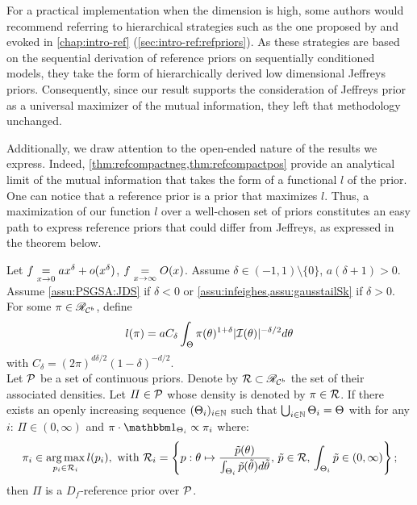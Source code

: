 For a practical implementation when the dimension is high, 
some authors would recommend referring
to hierarchical strategies such as the one proposed by \citet{berger_overall_2015} and evoked in \cref{chap:intro-ref} (\cref{sec:intro-ref:refpriors}). 
As these strategies are based on the sequential derivation of reference priors on sequentially conditioned models, they take the form of hierarchically derived low dimensional Jeffreys priors. Consequently, 
since our result supports the consideration of Jeffreys prior as a universal maximizer of the mutual information, they left that methodology unchanged.

Additionally, we draw attention to the open-ended nature of the results we express. 
Indeed, \cref{thm:refcompactneg,thm:refcompactpos} provide an analytical limit of the mutual information that takes the form of a functional $l$ of the prior.
One can notice that a reference prior is a prior that maximizes $l$.
Thus, a maximization of our function $l$ over a well-chosen set of priors constitutes an easy path to express reference priors that could differ from Jeffreys, as expressed in the theorem below.
\begin{thm}\label{thm:PSGSA:maximizel}
    Let $f\overset{}{\underset{x\rightarrow 0}{=}} a x^\delta+o(x^\delta)$, $f\overset{}{\underset{x\rightarrow\infty}{=}}O(x)$. Assume $\delta\in(-1,1)\!\setminus\{0\}$, $a(\delta+1)>0$. Assume \cref{assu:PSGSA:JDS} if $\delta<0$ or \cref{assu:infeighes,assu:gausstailSk} if $\delta>0$.
    For some $\pi\in\mathscr{R}_{\mathcal{C}^b}$, define
        \begin{equation}
            l(\pi) = aC_\delta\int_\Theta\pi(\theta)^{1+\delta}|\mathcal{I}(\theta)|^{-\delta/2}d\theta
        \end{equation}
    with $C_\delta=(2\pi)^{d\delta/2}(1-\delta)^{-d/2} $. \\
    Let $\mathcal{P}$ be a set of continuous priors. %
    Denote by $\mathcal{R}\subset\mathscr{R}_{\mathcal{C}^b}$ the set of their associated densities.
    Let $\varPi\in\mathcal{P}$ whose density is denoted by $\pi\in\mathcal{R}$.
    If there exists an openly increasing sequence $(\Theta_i)_{i\in\mathbb{N}}$ such that $\bigcup_{i\in\mathbb{N}}\Theta_i=\Theta$ with for any $i$: $\varPi\in(0,\infty)$ and $\pi\cdot\indic_{\Theta_i}\propto\pi_i$ where:
        \begin{equation}\label{eq:PSGSA:piiargmaxl}
            \pi_i\in \argmax_{p_i\in\cR_i} l(p_i) ,\text{\ with\ }\cR_i=\left\{p:\theta\mapsto\frac{\tilde p(\theta)}{\int_{\Theta_i}\tilde p(\tilde\theta)d\tilde\theta },\,   \tilde p\in\cR,\, \int_{\Theta_i}\tilde p\in(0,\infty)    \right\};
        \end{equation}
    then $\varPi$ is a $D_f$-reference prior over $\mathcal{P}$.
\end{thm}

